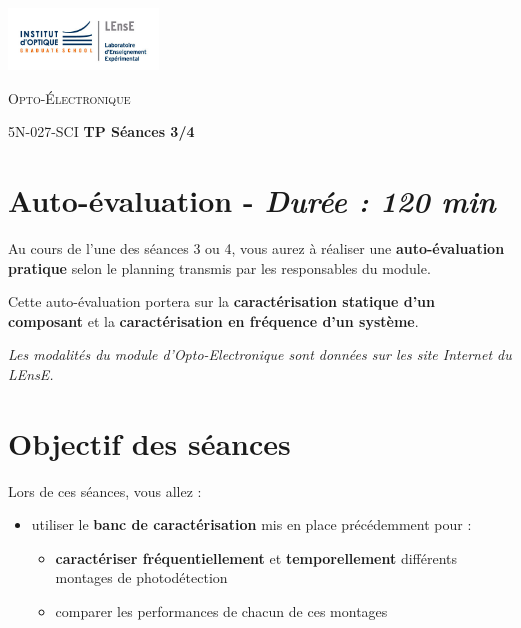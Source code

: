 \newpage

\begin{minipage}[c]{.25\linewidth}
	\includegraphics[width=4cm]{images/LEnsE_IOGS.jpg}
\end{minipage} \hfill
\begin{minipage}[c]{.4\linewidth}

\begin{center}
\vspace{0.3cm}
{\Large \textsc{Opto-Électronique}}

\medskip

5N-027-SCI \qquad \textbf{\Large TP Séances 3/4}

\end{center}
\end{minipage}\hfill

\section{Auto-évaluation - \textit{Durée : 120 min}}

Au cours de l'une des séances 3 ou 4, vous aurez à réaliser une \textbf{auto-évaluation pratique} selon le planning transmis par les responsables du module.

Cette auto-évaluation portera sur la \textbf{caractérisation statique d'un  composant} et la \textbf{caractérisation en fréquence d'un système}.

\medskip

\textit{Les modalités du module d'Opto-Electronique sont données sur les site Internet du LEnsE.}

\section{Objectif des séances}

Lors de ces séances, vous allez :

\begin{itemize}
	\item utiliser le \textbf{banc de caractérisation} mis en place précédemment pour :
	\begin{itemize}
		\item  \textbf{caractériser fréquentiellement} et \textbf{temporellement} différents montages de photodétection
		\item comparer les performances de chacun de ces montages
	\end{itemize} 
\end{itemize} 




